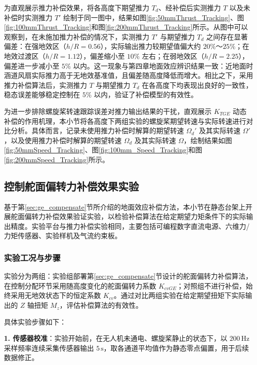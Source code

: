 为直观展示推力补偿效果，将各高度下期望推力 \(T_d\)、经补偿后实测推力 \(T\) 以及未补偿时实测推力 \(T'\) 绘制于同一图中，结果如图\ref{fig:50mmThrust_Tracking}、图\ref{fig:100mmThrust_Tracking}和图\ref{fig:200mmThrust_Tracking}所示。从图中可以观察到，在未施加推力补偿的情况下，实测推力 \(T'\) 与期望推力 \(T_d\) 之间存在显著偏差：在强地效区（\(h/R = 0.56\)），实际输出推力较期望值偏大约 \(20\%\)～\(25\%\)；在地效过渡区（\(h/R = 1.12\)），偏差缩小至 \(10\%\) 左右；在弱地效区（\(h/R = 2.25\)），偏差进一步减小至 \(5\%\) 以内。这一现象与第四章地面效应辨识结果一致：近地面时涵道风扇实际推力高于无地效基准值，且偏差随高度降低而增大。相比之下，采用推力补偿算法后，实测推力 \(T\) 与期望推力 \(T_d\) 在各高度下均表现出良好的一致性，稳态误差能够稳定控制在 \(5\%\) 以内，验证了补偿模型的有效性。

为进一步排除螺旋桨转速跟踪误差对推力输出结果的干扰，直观展示 \(K_{TGE}\) 动态补偿的作用机理，本小节将各高度下两组实验的螺旋桨期望转速与实际转速进行对比分析。具体而言，记录未使用推力补偿时解算的期望转速 \(\Omega_d'\) 及其实际转速 \(\Omega'\)，以及使用推力补偿时解算的期望转速 \(\Omega_d\) 及其实际转速 \(\Omega\)，绘制结果如图\ref{fig:50mmSpeed_Tracking}、图\ref{fig:100mm_Speed_Tracking}和图\ref{fig:200mmSpeed_Tracking}所示。
\subsection{控制舵面偏转力补偿效果实验}

基于第\ref{sec:ge_compensate}节所介绍的地面效应补偿方法，本小节在静态台架上开展舵面偏转力补偿效果验证实验，以检验补偿算法在给定期望力矩条件下的实际输出精度。实验平台与推力补偿实验相同，主要包括可编程数字直流电源、六维力/力矩传感器、实验样机及气流约束板。

\subsubsection{实验工况与步骤}

实验分为两组：实验组部署第\ref{sec:ge_compensate}节设计的舵面偏转力补偿算法，在控制分配环节采用随高度变化的舵面偏转力系数 \(K_{cvGE}\)；对照组不进行补偿，始终采用无地效状态下的恒定系数 \(K_{cv}\)。通过对比两组实验在给定期望扭矩下实际输出的 \(Z\) 轴扭矩 \(M_z\)，评估补偿算法的有效性。

具体实验步骤如下：

\textbf{1. 传感器校准}：实验开始前，在无人机未通电、螺旋桨静止的状态下，以 \(200\,\mathrm{Hz}\) 采样频率连续采集传感器输出 \(5\,\mathrm{s}\)，取各通道平均值作为静态零点偏置，用于后续数据修正。
    
